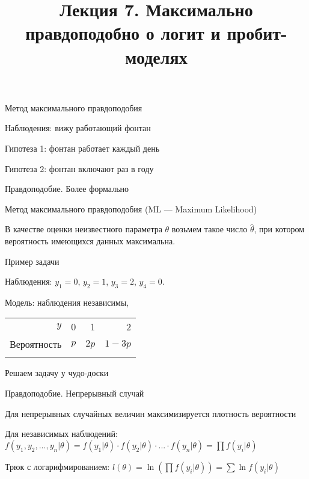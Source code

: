 \documentclass[ignorenonframetext,]{beamer}
\title{Лекция 7. Максимально правдоподобно о логит и пробит-моделях}
\begin{document}
\frame{\titlepage}

\begin{frame}{Метод максимального правдоподобия}

Наблюдения: вижу работающий фонтан

Гипотеза 1: фонтан работает каждый день

Гипотеза 2: фонтан включают раз в году

\end{frame}

\begin{frame}{Правдоподобие. Более формально}

Метод максимального правдоподобия (ML --- Maximum Likelihood)

В качестве оценки неизвестного параметра $\theta$ возьмем такое число
$\hat{\theta}$, при котором вероятность имеющихся данных максимальна.

\end{frame}

\begin{frame}{Пример задачи}

Наблюдения: $y_1=0$, $y_2=1$, $y_3=2$, $y_4=0$.

Модель: наблюдения независимы,

\begin{longtable}[c]{@{}rrrr@{}}
\toprule\addlinespace
$y$ & 0 & 1 & 2
\\\addlinespace
\midrule\endhead
Вероятность & $p$ & $2p$ & $1-3p$
\\\addlinespace
\bottomrule
\end{longtable}

\end{frame}

\begin{frame}{Решаем задачу у чудо-доски}

\end{frame}

\begin{frame}{Правдоподобие. Непрерывный случай}

Для непрерывных случайных величин максимизируется плотность вероятности

Для независимых наблюдений:
$f(y_1,y_2,...,y_n|\theta)=f(y_1|\theta)\cdot f(y_2|\theta)\cdot ...\cdot f(y_n|\theta)=\prod f(y_i|\theta)$

Трюк с логарифмированием:
$l(\theta)=\ln\left( \prod f(y_i|\theta) \right) = \sum \ln f(y_i|\theta)$

\end{frame}
\end{document}
